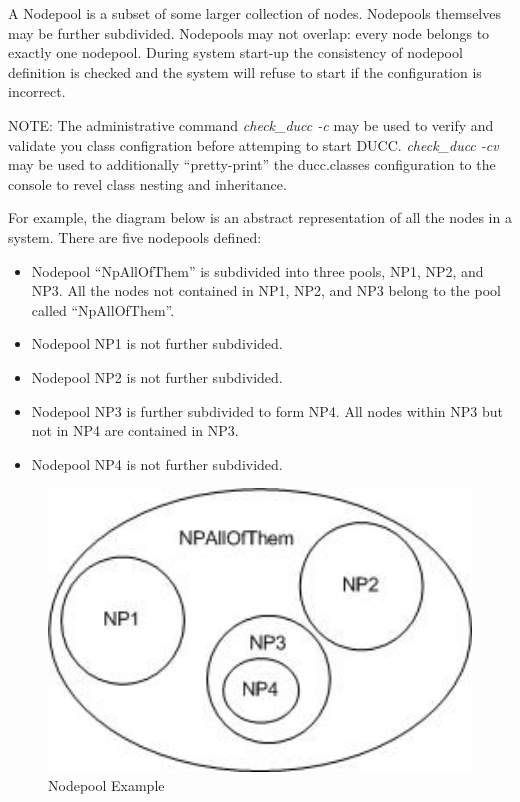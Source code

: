     A Nodepool is a subset of some larger collection of nodes.  Nodepools themselves may be
    further subdivided.  Nodepools may not overlap: every node belongs to exactly
    one nodepool.  During system start-up the consistency of nodepool definition is checked
    and the system will refuse to start if the configuration is incorrect.

    NOTE: The administrative command {\em check\_ducc -c} may be used to verify and validate
    you class configration before attemping to start DUCC.  {\em check\_ducc -cv} may be used
    to additionally ``pretty-print'' the ducc.classes configuration to the console to revel
    class nesting and inheritance.

    For example, the diagram below is an abstract representation of all the nodes in a
    system.  There are five nodepools defined:
    \begin{itemize}
      \item Nodepool ``NpAllOfThem'' is subdivided into three pools, NP1, NP2, and NP3.  All
        the nodes not contained in NP1, NP2, and NP3 belong to the pool called ``NpAllOfThem''.
      \item Nodepool NP1 is not further subdivided.
      \item Nodepool NP2 is not further subdivided.
      \item Nodepool NP3 is further subdivided to form NP4.  All nodes within NP3 but
        not in NP4 are contained in NP3.
      \item Nodepool NP4 is not further subdivided.
    \end{itemize}

    \begin{figure}[H]
      \centering
      \includegraphics[width=5.5in]{images/Nodepool1.jpg}
      \caption{Nodepool Example}
      \label{fig:Nodepools1}
    \end{figure}

